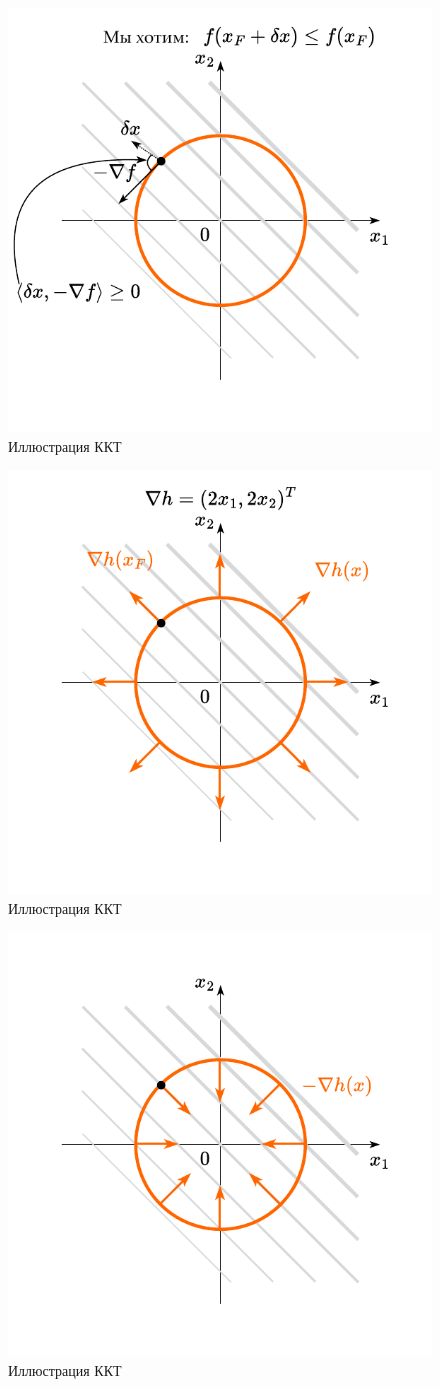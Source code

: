 \documentclass[
  russian,
  letterpaper,
  DIV=11,
  numbers=noendperiod]{scrartcl}
\begin{document}
\begin{figure}[H]

{\centering \includegraphics[width=0.5\linewidth,height=\textheight,keepaspectratio]{eq_constraint_6_ru.pdf}

}

\caption{Иллюстрация ККТ}

\end{figure}%

\begin{figure}[H]

{\centering \includegraphics[width=0.5\linewidth,height=\textheight,keepaspectratio]{eq_constraint_7.pdf}

}

\caption{Иллюстрация ККТ}

\end{figure}%

\begin{figure}[H]

{\centering \includegraphics[width=0.5\linewidth,height=\textheight,keepaspectratio]{eq_constraint_8.pdf}

}

\caption{Иллюстрация ККТ}

\end{figure}%
\end{document}
